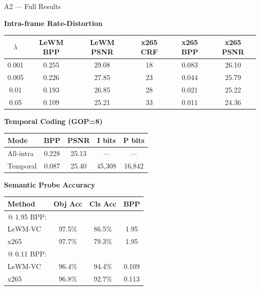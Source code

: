 \documentclass[aspectratio=169, professionalfonts, 10pt]{beamer}
\begin{document}
\begin{frame}[allowframebreaks]{A2 --- Full Results}

  \begin{center}
    \textbf{Intra-frame Rate-Distortion}
  \end{center}

  \begin{tabular}{cccccc}
    \toprule
    $\lambda$ & LeWM BPP & LeWM PSNR & x265 CRF & x265 BPP & x265 PSNR \\
    \midrule
    0.001 & 0.255 & 29.08 & 18 & 0.083 & 26.10 \\
    0.005 & 0.226 & 27.85 & 23 & 0.044 & 25.79 \\
    0.01  & 0.193 & 26.85 & 28 & 0.021 & 25.22 \\
    0.05  & 0.109 & 25.21 & 33 & 0.011 & 24.36 \\
    \bottomrule
  \end{tabular}

  \bigskip
  \begin{center}
    \textbf{Temporal Coding (GOP=8)}
  \end{center}

  \begin{tabular}{lcccc}
    \toprule
    Mode & BPP & PSNR & I bits & P bits \\
    \midrule
    All-intra & 0.228 & 25.13 & --- & --- \\
    Temporal  & 0.087 & 25.40 & 45,308 & 16,842 \\
    \bottomrule
  \end{tabular}

  \bigskip
  \begin{center}
    \textbf{Semantic Probe Accuracy}
  \end{center}

  \begin{tabular}{lccc}
    \toprule
    Method & Obj Acc & Cls Acc & BPP \\
    \midrule
    @ 1.95 BPP: & & & \\
    LeWM-VC & 97.5\% & 86.5\% & 1.95 \\
    x265     & 97.7\% & 79.3\% & 1.95 \\
    \midrule
    @ 0.11 BPP: & & & \\
    LeWM-VC & 96.4\% & 94.4\% & 0.109 \\
    x265     & 96.8\% & 92.7\% & 0.113 \\
    \bottomrule
  \end{tabular}


\end{frame}
\end{document}
